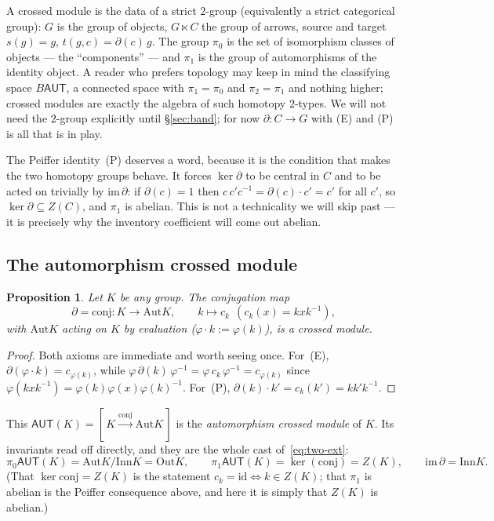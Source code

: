 \documentclass[11pt]{article}
\newtheorem{proposition}[theorem]{Proposition}
\theoremstyle{definition}
\newcommand{\id}{\mathrm{id}}
\newcommand{\Aut}{\mathrm{Aut}}
\newcommand{\Inn}{\mathrm{Inn}}
\newcommand{\Out}{\mathrm{Out}}
\newcommand{\conj}{\mathrm{conj}}
\newcommand{\AUT}{\mathsf{AUT}}
\newcommand{\pizero}{\pi_0}
\newcommand{\pione}{\pi_1}
\begin{document}
A crossed module is the data of a strict $2$-group (equivalently a strict categorical group): $G$
is the group of objects, $G\ltimes C$ the group of arrows, source and target
$s(g)=g$, $t(g,c)=\partial(c)\,g$. The group $\pizero$ is the set of isomorphism classes of objects
--- the ``components'' --- and $\pione$ is the group of automorphisms of the identity object. A
reader who prefers topology may keep in mind the classifying space $B\AUT$, a connected space with
$\pi_1=\pizero$ and $\pi_2=\pione$ and nothing higher; crossed modules are exactly the algebra of
such homotopy $2$-types. We will not need the $2$-group explicitly until \S\ref{sec:band}; for now
$\partial\colon C\to G$ with (E) and (P) is all that is in play.

The Peiffer identity~(P) deserves a word, because it is the condition that makes the two homotopy
groups behave. It forces $\ker\partial$ to be central in $C$ and to be acted on trivially by
$\mathrm{im}\,\partial$: if $\partial(c)=1$ then $c\,c'c^{-1}=\partial(c)\cdot c'=c'$ for all $c'$,
so $\ker\partial\subseteq Z(C)$, and $\pione$ is abelian. This is not a technicality we will skip
past --- it is precisely why the inventory coefficient will come out abelian.

\subsection{The automorphism crossed module}

\begin{proposition}\label{prop:aut-xmod}
Let $K$ be any group. The conjugation map
\[
\partial=\conj\colon K\longrightarrow \Aut K,\qquad k\mapsto c_k\ \ (c_k(x)=kxk^{-1}),
\]
with $\Aut K$ acting on $K$ by evaluation ($\varphi\cdot k:=\varphi(k)$), is a crossed module.
\end{proposition}

\begin{proof}
Both axioms are immediate and worth seeing once. For~(E), $\partial(\varphi\cdot k)=c_{\varphi(k)}$,
while $\varphi\,\partial(k)\,\varphi^{-1}=\varphi\,c_k\,\varphi^{-1}=c_{\varphi(k)}$ since
$\varphi(kxk^{-1})=\varphi(k)\varphi(x)\varphi(k)^{-1}$. For~(P),
$\partial(k)\cdot k'=c_k(k')=kk'k^{-1}$.
\end{proof}

This $\AUT(K)=[\,K\xrightarrow{\conj}\Aut K\,]$ is the \emph{automorphism crossed module} of $K$.
Its invariants read off directly, and they are the whole cast of~\eqref{eq:two-ext}:
\begin{equation}\label{eq:invariants}
\pizero\AUT(K)=\Aut K/\Inn K=\Out K,\qquad
\pione\AUT(K)=\ker(\conj)=Z(K),\qquad
\mathrm{im}\,\partial=\Inn K.
\end{equation}
(That $\ker\conj=Z(K)$ is the statement $c_k=\id\iff k\in Z(K)$; that $\pione$ is abelian is the
Peiffer consequence above, and here it is simply that $Z(K)$ is abelian.)
\end{document}
